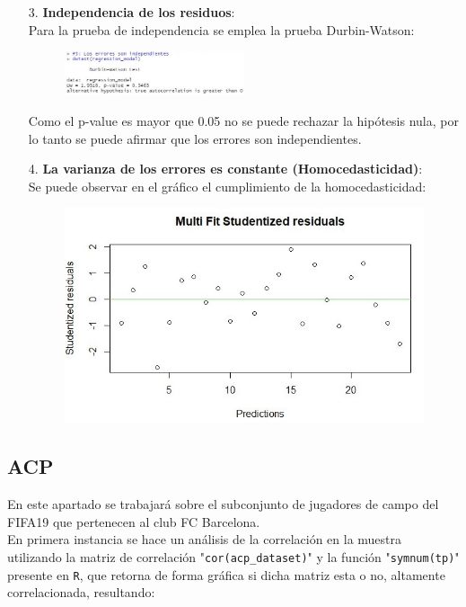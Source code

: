 \documentclass[a4paper,10pt,twocolumn]{article}
\begin{document}
\begin{enumerate}
	\item [3.] \textbf{Independencia de los residuos}:\\
	Para la prueba de independencia se emplea la prueba Durbin-Watson:
	
	\begin{figure}[h]
		\includegraphics[width=0.5\textwidth]{./imgs/reg_3.jpg}
	\end{figure}
	
	Como el p-value es mayor que 0.05 no se puede rechazar la hipótesis nula, por lo tanto se puede afirmar que los errores son independientes. \\
	
	\item[4.] \textbf{La varianza de los errores es constante (Homocedasticidad)}:\\
	
	Se puede observar en el gráfico el cumplimiento de la homocedasticidad:
	
	\begin{figure}[h]
		\includegraphics[scale=0.4]{./imgs/reg_4.jpg}
	\end{figure}
	
\end{enumerate}


\subsection*{ACP}

En este apartado se trabajará sobre el subconjunto de jugadores de campo del FIFA19 que pertenecen al club FC Barcelona.\\
En primera instancia se hace un análisis de la correlación en la muestra utilizando la matriz de correlación  "\verb|cor(acp_dataset)|" y la función "\verb|symnum(tp)|" presente en \verb|R|, que retorna de forma gráfica si dicha matriz esta o no, altamente correlacionada, resultando:
\end{document}
